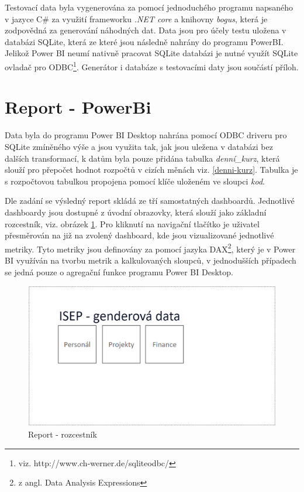 \documentclass[
  digital,     %
  twoside,     %
  lof,         %
  lot,         %
]{fithesis4}
\begin{document}
Testovací data byla vygenerována za pomocí jednoduchého programu napsaného v jazyce C\# za využití frameworku \emph{.NET core} a knihovny \emph{bogus}, která je zodpovědná za generování náhodných dat. Data jsou pro účely testu uložena v databázi SQLite, která ze které jsou následně nahrány do programu PowerBI. Jelikož Power BI neumí nativně pracovat SQLite databázi je nutné využít SQLite ovladač pro ODBC\footnote{viz. http://www.ch-werner.de/sqliteodbc/}. Generátor i databáze s testovacími daty jsou součástí příloh.



\section{Report - PowerBi}
Data byla do programu Power BI Desktop nahrána pomocí ODBC driveru pro SQLite zmíněného výše a jsou využita tak, jak jsou uležena v databázi bez dalších transformací, k datům byla pouze přidána tabulka \emph{denní\_kurz}, která slouží pro přepočet hodnot rozpočtů v cizích měnách viz. \ref{denni-kurz}. Tabulka je s rozpočtovou tabulkou propojena pomocí klíče uloženém ve sloupci \emph{kod}.  

Dle zadání se výsledný report skládá ze tří samostatných dashboardů. Jednotlivé dashboardy jsou dostupné z úvodní obrazovky, která slouží jako základní rozcestník, viz. obrázek \ref{fig:crossroad}. Pro kliknutí na navigační tlačítko je uživatel přesměrován na již na zvolený dashboard, kde jsou vizualizované jednotlivé metriky. Tyto metriky jsou definovány za pomocí jazyka DAX\footnote{z angl. Data Analysis Expressions}, který je v Power BI využíván na tvorbu metrik a kalkulovaných sloupců, v jednodušších případech se jedná pouze o agregační funkce programu Power BI Desktop.
    \begin{figure}[t]
        \begin{center}
            \includegraphics[width=13cm]{img/crossroad.png}
        \end{center}
        \caption{Report - rozcestník}
        \label{fig:crossroad}
    \end{figure}
\end{document}
